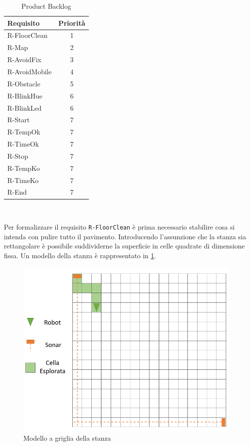 \documentclass{llncs}
\newcommand{\code}[1]{{\color{blue}\small{\texttt{#1}}}}
\begin{document}
\begin{table}
	\centering
	\begin{tabular}{|l|c|}
		\hline \textbf{Requisito} & \textbf{Priorità} \\ \hline
		R-FloorClean & 1 \\ \hline
		R-Map & 2 \\ \hline
		R-AvoidFix & 3 \\ \hline
		R-AvoidMobile & 4 \\ \hline
		R-Obstacle & 5 \\ \hline
		R-BlinkHue & 6 \\ \hline
		R-BlinkLed & 6 \\ \hline
		R-Start & 7 \\ \hline
		R-TempOk & 7 \\ \hline
		R-TimeOk & 7 \\ \hline
		R-Stop & 7 \\ \hline
		R-TempKo & 7 \\ \hline
		R-TimeKo & 7 \\ \hline
		R-End & 7 \\ \hline
	\end{tabular} 
	\\[1\baselineskip]
	\caption{Product Backlog}
	\label{tab:pb}
\end{table}
Per formalizzare il requisito \code{R-FloorClean} è prima necessario stabilire cosa si intenda con pulire tutto il pavimento. Introducendo l'assunzione che la stanza sia rettangolare è possibile suddividerne la superficie in celle quadrate di dimensione fissa. Un modello della stanza è rappresentato in \ref{fig:grid}. 

\begin{figure}[h!]
	\centering
	\includegraphics[scale=0.5]{img/grid.PNG}
	\caption{Modello a griglia della stanza}
	\label{fig:grid}
\end{figure}
\end{document}
